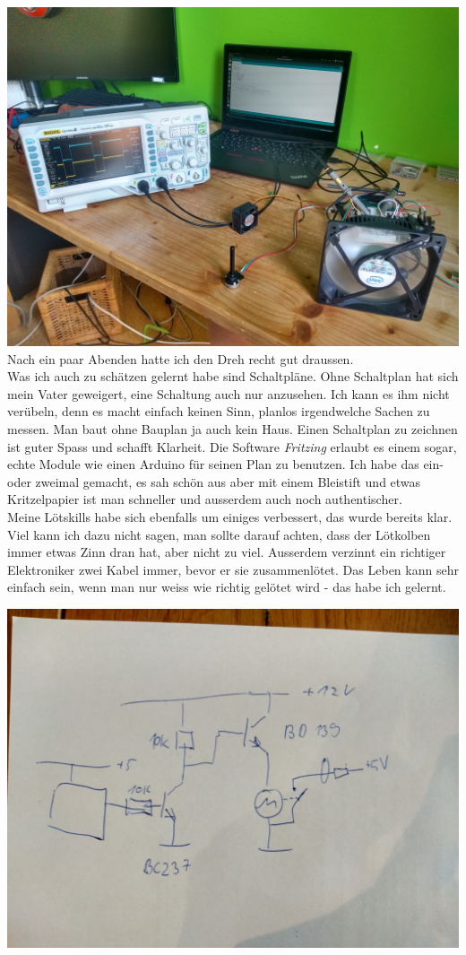 \documentclass[12pt,titlepage,a4paper]{article}
\begin{document}
\includegraphics[scale=0.07]{oszi2}
Nach ein paar Abenden hatte ich den Dreh recht gut draussen.\\Was ich auch zu schätzen gelernt habe sind Schaltpläne. Ohne Schaltplan hat sich mein Vater geweigert, eine Schaltung auch nur anzusehen. Ich kann es ihm nicht verübeln, denn es macht einfach keinen Sinn, planlos irgendwelche Sachen zu messen. Man baut ohne Bauplan ja auch kein Haus. Einen Schaltplan zu zeichnen ist guter Spass und schafft Klarheit. Die Software \textit{Fritzing } erlaubt es einem sogar, echte Module wie einen Arduino für seinen Plan zu benutzen. Ich habe das ein- oder zweimal gemacht, es sah schön aus aber mit einem Bleistift und etwas Kritzelpapier ist man schneller und ausserdem auch noch authentischer.\\Meine Lötskills habe sich ebenfalls um einiges verbessert, das wurde bereits klar. Viel kann ich dazu nicht sagen, man sollte darauf achten, dass der Lötkolben immer etwas Zinn dran hat, aber nicht zu viel. Ausserdem verzinnt ein richtiger Elektroniker zwei Kabel immer, bevor er sie zusammenlötet. Das Leben kann sehr einfach sein, wenn man nur weiss wie richtig gelötet wird - das habe ich gelernt.

\includegraphics[width=\textwidth, angle=0]{schaltplan}
\end{document}
